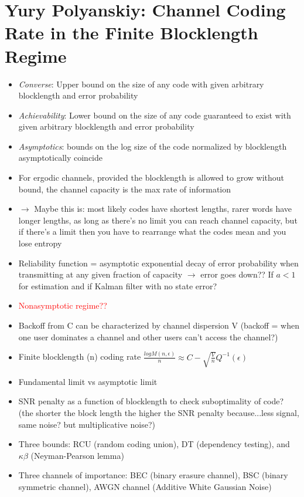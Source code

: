 \documentclass[leqno,twocolumn]{article}
\begin{document}
\section{Yury Polyanskiy: Channel Coding Rate in the Finite Blocklength Regime}
\begin{itemize}
\item \textit{Converse}: Upper bound on the size of any code with given arbitrary blocklength and error probability
\item \textit{Achievability}: Lower bound on the size of any code guaranteed to exist with given arbitrary blocklength and error probability
\item \textit{Asymptotics}: bounds on the log size of the code normalized by blocklength asymptotically coincide
\item For ergodic channels, provided the blocklength is allowed to grow without bound, the channel capacity is the max rate of information
\item $\rightarrow$ Maybe this is: most likely codes have shortest lengths, rarer words have longer lengths, as long as there's no limit you can reach channel capacity, but if there's a limit then you have to rearrange what the codes mean and you lose entropy
\item Reliability function = asymptotic exponential decay of error probability when transmitting at any given fraction of capacity $\rightarrow$ error goes down?? If $a < 1$ for estimation and if Kalman filter with no state error?
\item \textcolor{red}{Nonasymptotic regime??}
\item Backoff from C can be characterized by channel dispersion V (backoff = when one user dominates a channel and other users can't access the channel?)
\item Finite blocklength (n) coding rate $\frac{log M(n,\epsilon)}{n} \approx C - \sqrt{\frac{V}{n}}Q^{-1}(\epsilon)$
\item Fundamental limit vs asymptotic limit
\item SNR penalty as a function of blocklength to check suboptimality of code? (the shorter the block length the higher the SNR penalty because...less signal, same noise? but multiplicative noise?)
\item Three bounds: RCU (random coding union), DT (dependency testing), and $\kappa \beta$ (Neyman-Pearson lemma)
\item Three channels of importance: BEC (binary erasure channel), BSC (binary symmetric channel), AWGN channel (Additive White Gaussian Noise)
\end{itemize}
\end{document}
